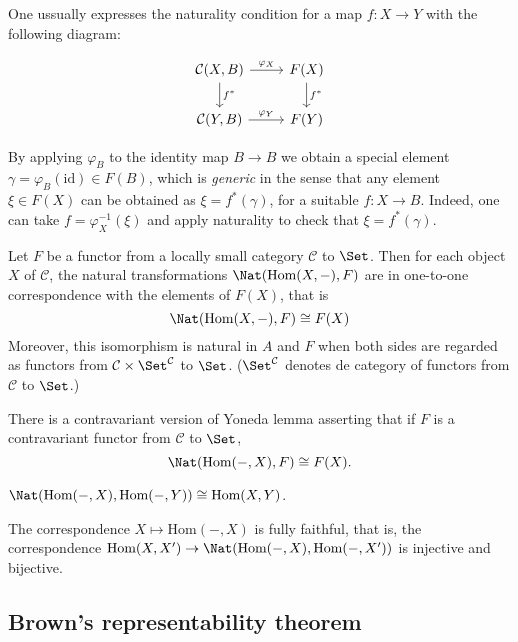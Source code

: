 \begin{remark}
\begin{definition}
\begin{definition}
	One ussually expresses the naturality condition for a map $f:X\to Y$ with the following diagram:

	\[\begin{tikzcd}
		\mathcal{C}(X,B)\arrow[r,"\varphi_{X}"]\arrow[d,"f^{*}"]&F(X)\arrow[d,"f^{*}"]\\
		\mathcal{C}(Y,B)\arrow[r,"\varphi_{Y}"]&F(Y)
	\end{tikzcd}\]
\end{definition}

\begin{remark}
	By applying $\varphi_{B}$ to the identity map  $B\to B$ we obtain a special element $\gamma=\varphi_{B}(\text{id})\in F(B)$, which is \textit{generic} in the sense that any element $\xi \in F(X)$ can be obtained as $\xi=f^{*} (\gamma)$, for a suitable $f:X\to B$. Indeed, one can take $f=\varphi^{-1}_{X}(\xi)$ and apply naturality to check that $\xi=f^{*}(\gamma)$. 
\end{remark}


\begin{lemma}
	Let $F$ be a functor from a locally small category $\mathcal{C}$ to $\Set$. Then for each object $X$ of $\mathcal{C}$, the natural transformations $\Nat(\text{Hom}(X,-),F)$ are in one-to-one correspondence with the elements of $F(X)$, that is
	\[\Nat(\text{Hom}(X,-), F)\cong F(X)\]
	Moreover, this isomorphism is natural in $A$ and $F$ when both sides are regarded as functors from $\mathcal{C}\times\Set^{\mathcal{C}}$ to $\Set$. ($\Set^{\mathcal{C}}$ denotes de category of functors from $\mathcal{C}$ to $\Set$.)
	
	There is a contravariant version of Yoneda lemma asserting that if $F$ is a contravariant functor from $\mathcal{C}$ to $\Set$,
	\[\Nat(\text{Hom}(-,X), F)\cong F(X).\]
\end{lemma}
\begin{coro}
	$\Nat (\text{Hom}(-,X),\text{Hom}(-,Y))\cong\text{Hom}(X,Y)$.
\end{coro}
\begin{remark}
	The correspondence $X\mapsto\text{Hom}(-,X)$ is fully faithful, that is, the correspondence $\text{Hom}(X,X')\to\Nat(\text{Hom}(-,X),\text{Hom}(-,X'))$ is injective and bijective.
\end{remark}

\subsection{Brown's representability theorem}


\end{definition}
\end{remark}
